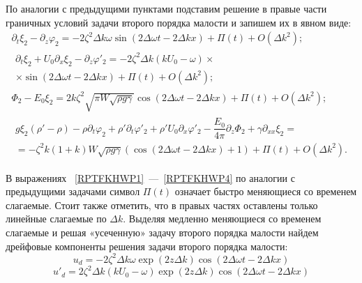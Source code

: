 По аналогии с предыдущими пунктами подставим решение  в правые части граничных условий  задачи второго порядка малости и запишем их в явном виде:
\begin{gather}
\partial_{t}\xi_{2}-\partial_{z}\varphi_{2}=-2\zeta^{2}\Delta k \omega \sin \left( 2 \Delta \omega t - 2 \Delta k x \right) + \Pi \left( t \right) + O \left( \Delta k^{2} \right); \label{RPTFKHWP1}\\
\begin{gathered}
\partial_{t}\xi_{2}+U_{0} \partial_{x}\xi_{2}-\partial_{z}\varphi'_{2}=-2\zeta^{2} \Delta k \left( k U_{0} - \omega \right)\times \\
\times \sin \left( 2 \Delta \omega t - 2 \Delta k x \right) + \Pi \left( t \right) + O \left( \Delta k^{2} \right);\label{RPTFKHWP2}
\end{gathered}
\\
\Phi_{2}-E_{0}\xi_{2}=2k \zeta^{2} \sqrt{\pi W \sqrt{\rho g \gamma}} \cos \left( 2 \Delta \omega t - 2 \Delta k x \right) + \Pi \left( t \right) + O \left( \Delta k^{2} \right); \label{RPTFKHWP3}\\
\begin{gathered}
g \xi_{2} \left( \rho' - \rho \right) - \rho \partial_{t} \varphi_{2} + \rho' \partial_{t} \varphi'_{2} +\rho' U_{0} \partial_{x}\varphi'_{2} - \dfrac{E_{0}}{4 \pi}\partial_{z}\Phi_{2}+\gamma \partial_{xx}\xi_{2}=\\
=-\zeta^{2}k \left( 1+k \right) W \sqrt{\rho g \gamma} \left( \cos \left( 2 \Delta \omega t - 2 \Delta k x \right) +1\right) + \Pi \left( t \right) + O \left( \Delta k^{2} \right).
\label{RPTFKHWP4}
\end{gathered}
\end{gather}	  	
	  	
В выражениях ~\eqref{RPTFKHWP1}~---~\eqref{RPTFKHWP4}  по аналогии с предыдущими задачами символ $  \Pi \left( t \right) $  означает быстро меняющиеся со временем слагаемые. Стоит также отметить, что в правых частях оставлены только линейные слагаемые по  $ \Delta k $.
Выделяя медленно меняющиеся со временем слагаемые и решая «усеченную» задачу второго порядка малости найдем дрейфовые компоненты решения задачи второго порядка малости:
\begin{equation}
u_{d}=-2\zeta^{2} \Delta k \omega \exp \left( 2 z \Delta k \right) \cos \left( 2 \Delta \omega t - 2 \Delta k x \right)
\label{udTFKHWP} 
\end{equation}
\begin{equation}
u'_{d}=2\zeta^{2} \Delta k \left( k U_{0}-\omega\right) \exp \left( 2 z \Delta k \right) \cos \left( 2 \Delta \omega t - 2 \Delta k x \right)
\label{ud'TFKHWP} 
\end{equation}	  	
	  	
